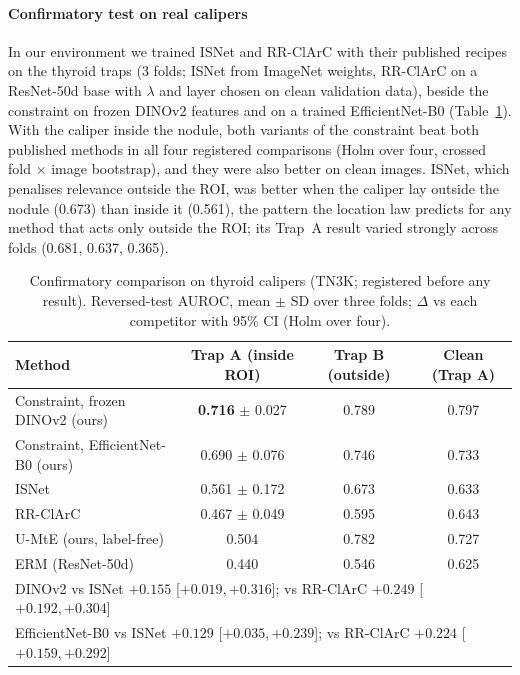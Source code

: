 \paragraph{Confirmatory test on real calipers} In our environment we trained ISNet \citep{bassi2024isnet} and RR-ClArC
\citep{pahde2025ensuring} with their published recipes on the thyroid traps (3 folds; ISNet from ImageNet weights,
RR-ClArC on a ResNet-50d base with $\lambda$ and layer chosen on clean validation data), beside the constraint on frozen
DINOv2 features and on a trained EfficientNet-B0 (Table~\ref{tab:repl_phase5}). With the caliper inside the nodule, both
variants of the constraint beat both published methods in all four registered comparisons (Holm over four, crossed fold
$\times$ image bootstrap), and they were also better on clean images. ISNet, which penalises relevance outside the ROI,
was better when the caliper lay outside the nodule (0.673) than inside it (0.561), the pattern the location law predicts
for any method that acts only outside the ROI; its Trap~A result varied strongly across folds (0.681, 0.637, 0.365).

\begin{table}[t]\centering\small
\caption{Confirmatory comparison on thyroid calipers (TN3K; registered before any result). Reversed-test AUROC, mean
$\pm$ SD over three folds; $\Delta$ vs each competitor with 95\% CI (Holm over four).}\label{tab:repl_phase5}
\begin{tabular}{lccc}\toprule
Method & Trap A (inside ROI) & Trap B (outside) & Clean (Trap A)\\\midrule
Constraint, frozen DINOv2 (ours) & \textbf{0.716} $\pm$ 0.027 & 0.789 & 0.797\\
Constraint, EfficientNet-B0 (ours) & 0.690 $\pm$ 0.076 & 0.746 & 0.733\\
ISNet \citep{bassi2024isnet} & 0.561 $\pm$ 0.172 & 0.673 & 0.633\\
RR-ClArC \citep{pahde2025ensuring} & 0.467 $\pm$ 0.049 & 0.595 & 0.643\\
U-MtE (ours, label-free) & 0.504 & 0.782 & 0.727\\
ERM (ResNet-50d) & 0.440 & 0.546 & 0.625\\\midrule
\multicolumn{4}{l}{DINOv2 vs ISNet $+0.155$ [$+0.019,+0.316$]; vs RR-ClArC $+0.249$ [$+0.192,+0.304$]}\\
\multicolumn{4}{l}{EfficientNet-B0 vs ISNet $+0.129$ [$+0.035,+0.239$]; vs RR-ClArC $+0.224$ [$+0.159,+0.292$]}\\
\bottomrule\end{tabular}\end{table}


